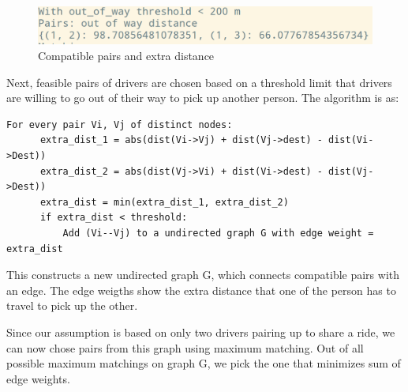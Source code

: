 \documentclass[main.tex]{subfiles}
\begin{document}
\begin{figure}[htpb]
  \centering
  \includegraphics[width=\linewidth]{compatibility_1.png}
  \caption{Compatible pairs and extra distance}
  \label{fig:p1}
\end{figure}
Next, feasible pairs of drivers are chosen based on a threshold limit that
drivers are willing to go out of their way to pick up another person. The
algorithm is as:

\begin{verbatim}
For every pair Vi, Vj of distinct nodes:
      extra_dist_1 = abs(dist(Vi->Vj) + dist(Vj->dest) - dist(Vi->Dest))
      extra_dist_2 = abs(dist(Vj->Vi) + dist(Vi->dest) - dist(Vj->Dest))
      extra_dist = min(extra_dist_1, extra_dist_2)
      if extra_dist < threshold:
          Add (Vi--Vj) to a undirected graph G with edge weight = extra_dist
\end{verbatim}

This constructs a new undirected graph G, which connects compatible pairs with
an edge. The edge weigths show the extra distance that one of the person has to
travel to pick up the other.

Since our assumption is based on only two drivers pairing up to share a ride, we
can now chose pairs from this graph using maximum matching.
Out of all possible maximum matchings on graph G, we pick the one that minimizes
sum of edge weights.
\end{document}
